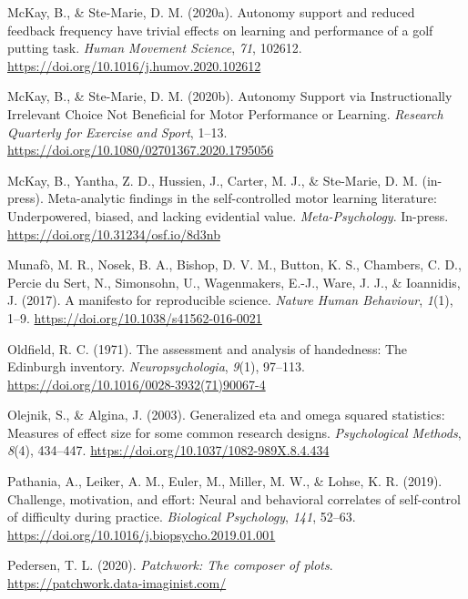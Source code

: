 \documentclass[
  doc, donotrepeattitle,floatsintext]{apa7}
\newlength{\cslhangindent}
\newlength{\cslentryspacingunit} %
\newenvironment{CSLReferences}[2] %
 {%
  \setlength{\parindent}{0pt}
  \ifodd #1
  \let\oldpar\par
  \def\par{\hangindent=\cslhangindent\oldpar}
  \fi
  \setlength{\parskip}{#2\cslentryspacingunit}
 }%
 {}
\begin{document}
\begin{CSLReferences}{1}{0}
\leavevmode{}%
McKay, B., \& Ste-Marie, D. M. (2020a). Autonomy support and reduced feedback frequency have trivial effects on learning and performance of a golf putting task. \emph{Human Movement Science}, \emph{71}, 102612. \url{https://doi.org/10.1016/j.humov.2020.102612}

\leavevmode{}%
McKay, B., \& Ste-Marie, D. M. (2020b). Autonomy {Support} via {Instructionally} {Irrelevant} {Choice} {Not} {Beneficial} for {Motor} {Performance} or {Learning}. \emph{Research Quarterly for Exercise and Sport}, 1--13. \url{https://doi.org/10.1080/02701367.2020.1795056}

\leavevmode{}%
McKay, B., Yantha, Z. D., Hussien, J., Carter, M. J., \& Ste-Marie, D. M. (in-press). Meta-analytic findings in the self-controlled motor learning literature: {Underpowered}, biased, and lacking evidential value. \emph{Meta-Psychology}. In-press. \url{https://doi.org/10.31234/osf.io/8d3nb}

\leavevmode{}%
Munafò, M. R., Nosek, B. A., Bishop, D. V. M., Button, K. S., Chambers, C. D., Percie du Sert, N., Simonsohn, U., Wagenmakers, E.-J., Ware, J. J., \& Ioannidis, J. (2017). A manifesto for reproducible science. \emph{Nature Human Behaviour}, \emph{1}(1), 1--9. \url{https://doi.org/10.1038/s41562-016-0021}

\leavevmode{}%
Oldfield, R. C. (1971). The assessment and analysis of handedness: The {Edinburgh} inventory. \emph{Neuropsychologia}, \emph{9}(1), 97--113. \url{https://doi.org/10.1016/0028-3932(71)90067-4}

\leavevmode{}%
Olejnik, S., \& Algina, J. (2003). Generalized eta and omega squared statistics: Measures of effect size for some common research designs. \emph{Psychological Methods}, \emph{8}(4), 434--447. \url{https://doi.org/10.1037/1082-989X.8.4.434}

\leavevmode{}%
Pathania, A., Leiker, A. M., Euler, M., Miller, M. W., \& Lohse, K. R. (2019). Challenge, motivation, and effort: {Neural} and behavioral correlates of self-control of difficulty during practice. \emph{Biological Psychology}, \emph{141}, 52--63. \url{https://doi.org/10.1016/j.biopsycho.2019.01.001}

\leavevmode{}%
Pedersen, T. L. (2020). \emph{Patchwork: The composer of plots}. \url{https://patchwork.data-imaginist.com/}


\end{CSLReferences}
\end{document}

